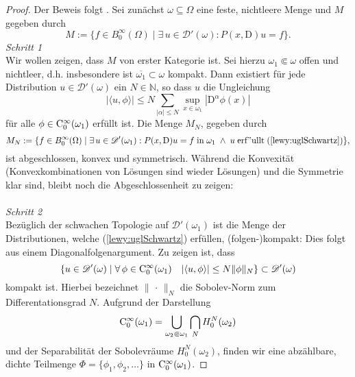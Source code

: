 \begin{proof} Der Beweis folgt {\cite[Theorem 3.2]{Hormander:1960a}}.
Sei zunächst $\omega\subseteq\Omega$ eine feste, nichtleere Menge und $M$ gegeben durch
\begin{equation}
M:=\{f\in B_0^\infty(\Omega)\mid \exists\,u\in\mathscr{D}'(\omega) : P(x,\mathrm{D})u=f\}.
\end{equation}
\textit{Schritt 1}\\
Wir wollen zeigen, dass $M$ von erster Kategorie ist. Sei hierzu $\omega_1\Subset\omega$ offen und nichtleer, d.h. insbesondere ist $\overline{\omega_1}\subset\omega$ kompakt. Dann existiert für jede Distribution $u\in\mathscr{D}'(\omega)$ ein $N\in\mathbb{N}$, so dass $u$ die Ungleichung
\begin{equation}\label{lewy:uglSchwartz}
|\langle u,\phi\rangle|\leq N\sum_{|\alpha|\leq N}\sup\limits_{x\in\omega_1} |\mathrm{D}^\alpha \phi(x)| 
\end{equation}
für alle $\phi\in \mathrm C_0^\infty(\omega_1)$ erfüllt ist. Die Menge $M_N$, gegeben durch
\begin{equation}
M_N:= \{f\in B_0^\infty(\Omega)\mid \exists\,u\in\mathscr D'(\omega_1): P(x,\mathrm{D})u=f\;\mathrm{in}\;\omega_1\;\wedge\; u\mathrm{\;erf"ullt\;}(\ref{lewy:uglSchwartz})\},
\end{equation}
ist abgeschlossen, konvex und symmetrisch. Während die Konvexität (Konvexkombinationen von Lösungen sind wieder Lösungen) und die Symmetrie klar sind, bleibt noch die Abgeschlossenheit zu zeigen:\\\\
\textit{Schritt 2}\\
Bezüglich der schwachen Topologie auf $\mathscr{D}'(\omega_1)$ ist die Menge der Distributionen, welche (\ref{lewy:uglSchwartz}) erfüllen, (folgen-)kompakt: Dies folgt aus einem Diagonalfolgenargument. Zu zeigen ist, dass
\begin{equation}
\{u\in\mathscr D'(\omega)\mid \forall\,\phi\in \mathrm C_0^\infty(\omega_1)\quad |\langle u,\phi\rangle|\leq N \|\phi\|_N\}\subset\mathscr D'(\omega)
\end{equation}
kompakt ist. Hierbei bezeichnet $\|\,\cdot\,\|_N$ die Sobolev-Norm zum Differentationsgrad $N$. 
Aufgrund der Darstellung
\begin{equation}
\mathrm C_0^\infty(\omega_1)=\bigcup\limits_{\omega_2\Subset\omega_1}\bigcap\limits_N H_0^N(\omega_2)
\end{equation}
und der Separabilität der Sobolevräume $H_0^N(\omega_2)$, finden wir eine abzählbare, dichte Teilmenge $\Phi=\{\phi_1,\phi_2,\ldots\}$ in $\mathrm C_0^\infty(\omega_1)$.

\end{proof}
